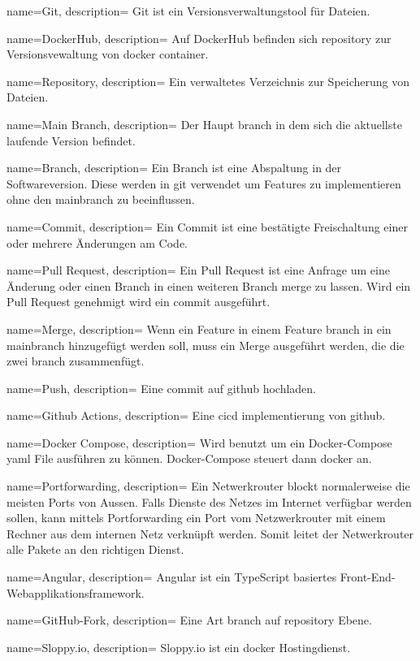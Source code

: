 {
	name=Git,
	description={
		Git ist ein Versionsverwaltungstool für Dateien.
	}
}

{
	name=DockerHub,
	description={
		Auf DockerHub befinden sich \gls{repository} zur Versionsvewaltung von \gls{docker} \gls{container}.
	}
}

{
	name=Repository,
	description={
		Ein verwaltetes Verzeichnis zur Speicherung von Dateien.
	}
}

{
	name=Main Branch,
	description={
		Der Haupt \gls{branch} in dem sich die aktuellste laufende Version befindet.
	}
}

{
	name=Branch,
	description={
		Ein Branch ist eine Abspaltung in der Softwareversion. Diese werden in \gls{git} verwendet um Features zu implementieren ohne den \gls{mainbranch} zu beeinflussen.
	}
}

{
	name=Commit,
	description={
		Ein Commit ist eine bestätigte Freischaltung einer oder mehrere Änderungen am Code.
	}
}

{
	name=Pull Request,
	description={
		Ein Pull Request ist eine Anfrage um eine Änderung oder einen Branch in einen weiteren Branch \gls{merge} zu lassen. Wird ein Pull Request genehmigt wird ein \gls{commit} ausgeführt.
	}
}

{
	name=Merge,
	description={
		Wenn ein Feature in einem Feature \gls{branch} in ein \gls{mainbranch} hinzugefügt werden soll, muss ein Merge ausgeführt werden, die die zwei \gls{branch} zusammenfügt.
	}
}

{
	name=Push,
	description={
		Eine \gls{commit} auf \gls{github} hochladen.
	}
}

{
	name=Github Actions,
	description={
		Eine \gls{cicd} implementierung von \gls{github}.
	}
}

{
	name=Docker Compose,
	description={
		Wird benutzt um ein Docker-Compose \gls{yaml} File ausführen zu können. Docker-Compose steuert dann \gls{docker} an.
	}
}

{
	name=Portforwarding,
	description={
		Ein Netwerkrouter blockt normalerweise die meisten Ports von Aussen. Falls Dienste des Netzes im Internet verfügbar werden sollen, kann mittels Portforwarding ein Port vom Netzwerkrouter mit einem Rechner aus dem internen Netz verknüpft werden. Somit leitet der Netwerkrouter alle Pakete an den richtigen Dienst.
	}
}

{
	name=Angular,
	description={
		Angular ist ein TypeScript basiertes Front-End-Webapplikationsframework.
	}
}

{
	name=GitHub-Fork,
	description={
		Eine Art \gls{branch} auf \gls{repository} Ebene.
	}
}

{
	name=Sloppy.io,
	description={
		Sloppy.io ist ein \gls{docker} Hostingdienst.
	}
}
